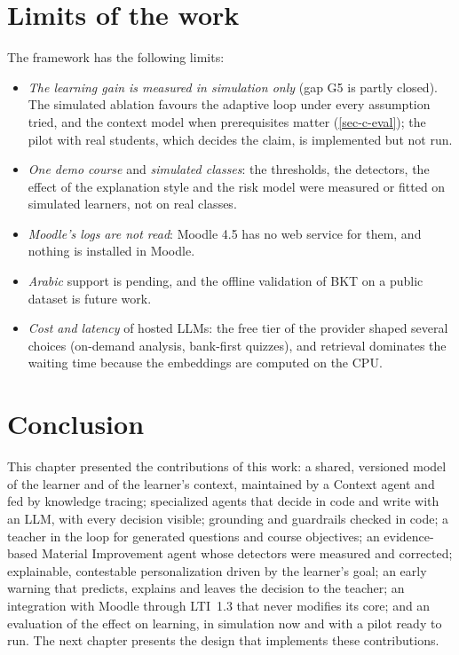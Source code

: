 \section{Limits of the work}
\label{sec-c-limits}

The framework has the following limits:
\begin{itemize}
  \item \emph{The learning gain is measured in simulation only} (gap G5
        is partly closed). The simulated ablation favours the adaptive
        loop under every assumption tried, and the context model when
        prerequisites matter (\cref{sec-c-eval}); the pilot with real
        students, which decides the claim, is implemented but not run.
  \item \emph{One demo course} and \emph{simulated classes}: the
        thresholds, the detectors, the effect of the explanation style and
        the risk model were measured or fitted on simulated learners, not
        on real classes.
  \item \emph{Moodle's logs are not read}: Moodle 4.5 has no web service
        for them, and nothing is installed in Moodle.
  \item \emph{Arabic} support is pending, and the offline validation of
        BKT on a public dataset is future work.
  \item \emph{Cost and latency} of hosted LLMs: the free tier of the
        provider shaped several choices (on-demand analysis, bank-first
        quizzes), and retrieval dominates the waiting time because the
        embeddings are computed on the CPU.
\end{itemize}

\section*{Conclusion}

This chapter presented the contributions of this work: a shared, versioned model of the
learner and of the learner's context, maintained by a Context agent and
fed by knowledge tracing; specialized agents that decide in code and
write with an LLM, with every decision visible; grounding and guardrails
checked in code; a teacher in the loop for generated questions and
course objectives; an evidence-based Material Improvement agent whose
detectors were measured and corrected; explainable, contestable
personalization driven by the learner's goal; an early warning that
predicts, explains and leaves the decision to the teacher; an
integration with Moodle through LTI~1.3 that never modifies its core; and
an evaluation of the effect on learning, in simulation now and with a
pilot ready to run. The next chapter presents the design that implements
these contributions.
